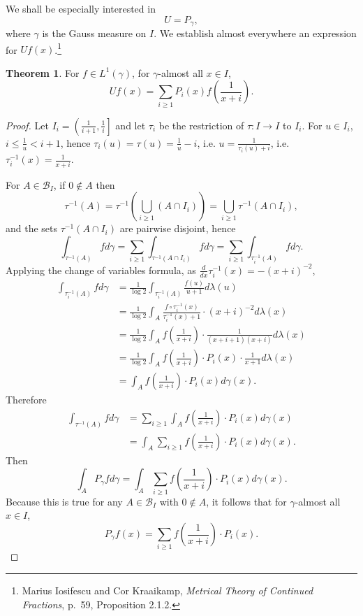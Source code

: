 \documentclass{article}
\theoremstyle{definition}
\newtheorem{theorem}{Theorem}
\theoremstyle{definition}
\begin{document}
We shall be especially interested in
\[
U=P_\gamma,
\]
where $\gamma$ is the Gauss measure on $I$. We establish almost everywhere an expression for $Uf(x)$.\footnote{Marius Iosifescu and Cor Kraaikamp,
{\em Metrical Theory of Continued Fractions}, p.~59, Proposition 2.1.2.}

\begin{theorem}
For $f \in L^1(\gamma)$, for $\gamma$-almost all $x \in I$,
\[
Uf(x) = \sum_{i \geq 1} P_i(x) f \left( \frac{1}{x+i} \right).
\]
\end{theorem}
\begin{proof}
Let $I_i = \left(\frac{1}{i+1},\frac{1}{i}\right]$ and let $\tau_i$ be the restriction of $\tau:I \to I$ to $I_i$.
For $u \in I_i$, $i \leq \frac{1}{u} < i+1$, hence $\tau_i(u)=\tau(u) = \frac{1}{u}-i$,
i.e. $u=\frac{1}{\tau_i(u)+i}$, i.e. $\tau_i^{-1}(x) = \frac{1}{x+i}$.


For $A \in \mathscr{B}_I$, if $0 \not \in A$ then 
\[
\tau^{-1}(A) = \tau^{-1}\left(\bigcup_{i \geq 1} (A \cap I_i) \right)
=\bigcup_{i \geq 1} \tau^{-1}(A \cap I_i),
\]
and the sets $\tau^{-1}(A \cap I_i)$ are pairwise disjoint, hence
\[
\int_{\tau^{-1}(A)} f d\gamma=\sum_{i \geq 1} \int_{\tau^{-1}(A \cap I_i)}  f d\gamma
=\sum_{i \geq 1} \int_{\tau_i^{-1}(A)}  f d\gamma.
\]
Applying the change of variables formula, as $\frac{d}{dx} \tau_i^{-1}(x) = -(x+i)^{-2}$,
\begin{align*}
\int_{\tau_i^{-1}(A)}  f d\gamma&=\frac{1}{\log 2} \int_{\tau_i^{-1}(A)} \frac{f(u)}{u+1} d\lambda(u)\\
&=\frac{1}{\log 2} \int_A \frac{f \circ \tau_i^{-1}(x)}{\tau_i^{-1}(x)+1} \cdot (x+i)^{-2} d\lambda(x)\\
&=\frac{1}{\log 2} \int_A f\left(\frac{1}{x+i}\right) \cdot \frac{1}{(x+i+1)(x+i)} d\lambda(x)\\
&=\frac{1}{\log 2} \int_A  f\left(\frac{1}{x+i}\right) \cdot P_i(x) \cdot \frac{1}{x+1} d\lambda(x)\\
&=\int_A    f\left(\frac{1}{x+i}\right) \cdot P_i(x) d\gamma(x).
\end{align*}
Therefore
\begin{align*}
\int_{\tau^{-1}(A)} f d\gamma&=\sum_{i \geq 1} \int_A    f\left(\frac{1}{x+i}\right) \cdot P_i(x) d\gamma(x)\\
&= \int_A \sum_{i \geq 1}  f\left(\frac{1}{x+i}\right) \cdot P_i(x) d\gamma(x).
\end{align*}
Then
\[
\int_A P_\gamma f d\gamma =  \int_A \sum_{i \geq 1}  f\left(\frac{1}{x+i}\right) \cdot P_i(x) d\gamma(x).
\]
Because this is true for any $A \in \mathscr{B}_I$ with $0 \not \in A$, it follows that
for $\gamma$-almost all $x \in I$,
\[
P_\gamma f(x) =  \sum_{i \geq 1}  f\left(\frac{1}{x+i}\right) \cdot P_i(x).
\]
\end{proof}
\end{document}
